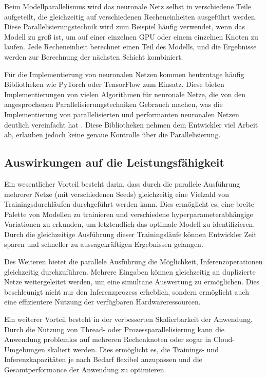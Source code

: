 Beim Modellparallelismus wird das neuronale Netz selbst in verschiedene Teile aufgeteilt, die gleichzeitig auf verschiedenen Recheneinheiten ausgeführt werden. Diese Parallelisierungstechnik wird zum Beispiel häufig verwendet, wenn das Modell zu groß ist, um auf einer einzelnen GPU oder einem einzelnen Knoten zu laufen. Jede Recheneinheit berechnet einen Teil des Modells, und die Ergebnisse werden zur Berechnung der nächsten Schicht kombiniert.

Für die Implementierung von neuronalen Netzen kommen heutzutage häufig Bibliotheken wie PyTorch oder TensorFlow zum Einsatz. Diese bieten Implementierungen von vielen Algorithmen für neuronale Netze, die von den angesprochenen Parallelisierungstechniken Gebrauch machen, was die Implementierung von parallelisierten und performanten neuronalen Netzen deutlich vereinfacht hat \citep{pytorch_advances_in_neural_systems}.
Diese Bibliotheken nehmen dem Entwickler viel Arbeit ab, erlauben jedoch keine genaue Kontrolle über die Parallelisierung.

\subsection{Auswirkungen auf die Leistungsfähigkeit}
\label{sec:Grundlagen_Parallelisierung_Leistungsfähigkeit}

Ein wesentlicher Vorteil besteht darin, dass durch die parallele Ausführung mehrerer Netze (mit verschiedenen Seeds) gleichzeitig eine Vielzahl von Trainingsdurchläufen durchgeführt werden kann. Dies ermöglicht es, eine breite Palette von Modellen zu trainieren und verschiedene hyperparameterabhängige Variationen zu erkunden, um letztendlich das optimale Modell zu identifizieren. Durch die gleichzeitige Ausführung dieser Trainingsläufe können Entwickler Zeit sparen und schneller zu aussagekräftigen Ergebnissen gelangen.

Des Weiteren bietet die parallele Ausführung die Möglichkeit, Inferenzoperationen gleichzeitig durchzuführen. Mehrere Eingaben können gleichzeitig an duplizierte Netze weitergeleitet werden, um eine simultane Auswertung zu ermöglichen. Dies beschleunigt nicht nur den Inferenzprozess erheblich, sondern ermöglicht auch eine effizientere Nutzung der verfügbaren Hardwareressourcen.

Ein weiterer Vorteil besteht in der verbesserten Skalierbarkeit der Anwendung. Durch die Nutzung von Thread- oder Prozessparallelisierung kann die Anwendung problemlos auf mehreren Rechenknoten oder sogar in Cloud-Umgebungen skaliert werden. Dies ermöglicht es, die Trainings- und Inferenzkapazitäten je nach Bedarf flexibel anzupassen und die Gesamtperformance der Anwendung zu optimieren.
